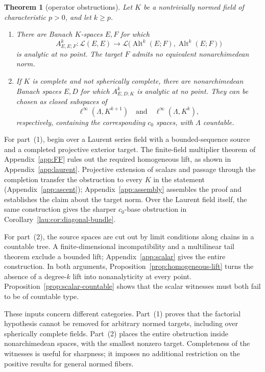 \documentclass[11pt]{amsart}
\newtheorem{theorem}{Theorem}[section]
\theoremstyle{definition}
\theoremstyle{remark}
\numberwithin{equation}{section}
\newcommand{\cL}{\mathcal L}
\newcommand{\Alt}{\operatorname{Alt}}
\newcommand{\linf}{\ell^\infty}
\begin{document}
\begin{theorem}[operator obstructions]\label{thm:operator-obstructions}
Let $K$ be a nontrivially normed field of characteristic $p>0$, and let $k\ge p$.
\begin{enumerate}
\item There are Banach $K$\nobreakdash-spaces $E,F$ for which
\[
 A^k_{E,E;F}\colon\cL(E,E)\longrightarrow
 \cL\bigl(\Alt^k(E;F),\Alt^k(E;F)\bigr)
\]
is analytic at no point. The target $F$ admits no equivalent nonarchimedean norm.
\item If $K$ is complete and not spherically complete, there are nonarchimedean Banach spaces $E,D$ for which $A^k_{E,D;K}$ is analytic at no point. They can be chosen as closed subspaces of
\[
 \linf(\Lambda,K^{k+1})\quad\text{and}\quad\linf(\Lambda,K^k),
\]
respectively, containing the corresponding $c_0$ spaces, with $\Lambda$ countable.
\end{enumerate}
\end{theorem}

For part~(1), begin over a Laurent series field with a bounded-sequence source and a completed
projective exterior target. The finite-field multiplier theorem of Appendix~\ref{app:FF} rules out
the required homogeneous lift, as shown in Appendix~\ref{app:laurent}. Projective extension of
scalars and passage through the completion transfer the obstruction to every $K$ in the statement
(Appendix~\ref{app:ascent}); Appendix~\ref{app:assembly} assembles the proof and establishes the claim
about the target norm. Over the Laurent field itself, the same construction gives the sharper
$c_0$-base obstruction in
Corollary~\ref{lau:cor:diagonal-bundle}.

For part~(2), the source spaces are cut out by limit conditions along chains in a countable tree.
A finite-dimensional incompatibility and a multilinear tail theorem exclude a bounded lift;
Appendix~\ref{app:scalar} gives the entire construction. In both arguments,
Proposition~\ref{prop:homogeneous-lift} turns the absence of a degree-$k$ lift into nonanalyticity at
every point. Proposition~\ref{prop:scalar-countable} shows that the scalar witnesses must both fail
to be of countable type.

These inputs concern different categories. Part~(1) proves that the factorial hypothesis cannot be removed for arbitrary normed targets, including over spherically complete fields. Part~(2) places the entire obstruction inside nonarchimedean spaces, with the smallest nonzero target. Completeness of the witnesses is useful for sharpness; it imposes no additional restriction on the positive results for general normed fibers.
\end{document}
